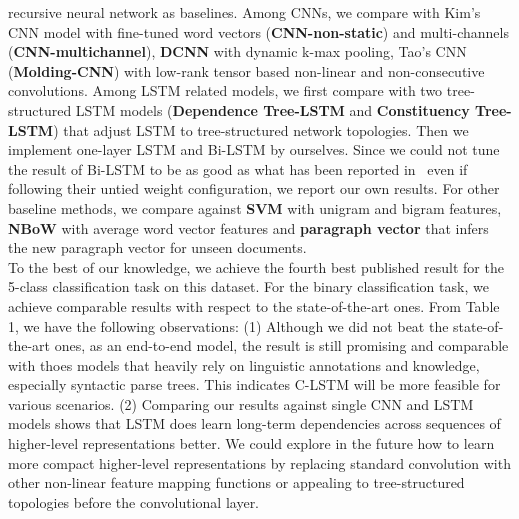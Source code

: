 \documentclass[11pt,letterpaper]{article}
\begin{document}
recursive neural network as baselines. Among CNNs, we compare with
Kim's~ CNN model with fine-tuned word vectors
({\bf CNN-non-static}) and multi-channels ({\bf CNN-multichannel}), {\bf DCNN} with
dynamic k-max pooling, Tao's CNN ({\bf Molding-CNN}) with low-rank tensor
based non-linear and non-consecutive convolutions. Among LSTM related
models, we first compare
with two tree-structured LSTM models ({\bf Dependence Tree-LSTM} and
{\bf Constituency Tree-LSTM}) that adjust LSTM to
tree-structured network topologies. Then we implement one-layer LSTM and
Bi-LSTM by ourselves. Since we could not tune the result of Bi-LSTM to
be as good as what has been reported in~\cite{tai2015} even if following
their untied weight configuration, we report our own results. For other
baseline methods, we compare against {\bf SVM} with unigram and bigram
features, {\bf NBoW} with average word vector features and {\bf paragraph vector}
that infers the new paragraph vector for unseen documents.\\
\indent To the best of our knowledge, we achieve the fourth best
published result for the 5-class classification task on this dataset.
For the binary classification task, we achieve comparable results with
respect to the state-of-the-art ones.
From Table 1, we have the following observations: (1) Although we did not beat the state-of-the-art ones, as an end-to-end model, the result is still promising and comparable with thoes models that heavily rely on linguistic annotations and knowledge, especially syntactic parse trees. This indicates C-LSTM will be more feasible for various scenarios.
(2) Comparing our results against single CNN and LSTM models shows that LSTM does learn long-term dependencies across sequences of higher-level representations better. We could explore in
the future how to learn more compact higher-level representations by
replacing standard convolution with other non-linear feature mapping
functions or appealing to tree-structured topologies before the
convolutional layer.
\end{document}
